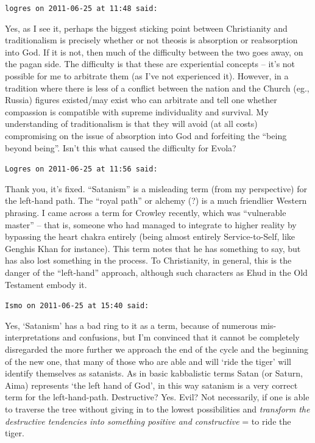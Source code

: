 \begin{footnotesize}
\begin{sffamily}
\hfill

\texttt{logres on 2011-06-25 at 11:48 said:}

Yes, as I see it, perhaps the biggest sticking point between Christianity and traditionalism is precisely whether or not theosis is absorption or reabsorption into God. If it is not, then much of the difficulty between the two goes away, on the pagan side. The difficulty is that these are experiential concepts -- it's not possible for me to arbitrate them (as I've not experienced it). However, in a tradition where there is less of a conflict between the nation and the Church (eg., Russia) figures existed/may exist who can arbitrate and tell one whether compassion is compatible with supreme individuality and survival. My understanding of traditionalism is that they will avoid (at all costs) compromising on the issue of absorption into God and forfeiting the ``being beyond being''. Isn't this what caused the difficulty for Evola?

\hfill

\texttt{Logres on 2011-06-25 at 11:56 said:}

Thank you, it's fixed. ``Satanism'' is a misleading term (from my perspective) for the left-hand path. The ``royal path'' or alchemy (?) is a much friendlier Western phrasing. I came across a term for Crowley recently, which was ``vulnerable master'' -- that is, someone who had managed to integrate to higher reality by bypassing the heart chakra entirely (being almost entirely Service-to-Self, like Genghis Khan for instance). This term notes that he has something to say, but has also lost something in the process. To Christianity, in general, this is the danger of the ``left-hand'' approach, although such characters as Ehud in the Old Testament embody it.

\hfill

\texttt{Ismo on 2011-06-25 at 15:40 said:}

Yes, `Satanism' has a bad ring to it as a term, because of numerous mis-interpretations and confusions, but I'm convinced that it cannot be completely disregarded the more further we approach the end of the cycle and the beginning of the new one, that many of those who are able and will `ride the tiger' will identify themselves as satanists. As in basic kabbalistic terms Satan (or Saturn, Aima) represents `the left hand of God', in this way satanism is a very correct term for the left-hand-path. Destructive? Yes. Evil? Not necessarily, if one is able to traverse the tree without giving in to the lowest possibilities and \emph{transform the destructive tendencies into something positive and constructive} = to ride the tiger.


\end{sffamily}
\end{footnotesize}
